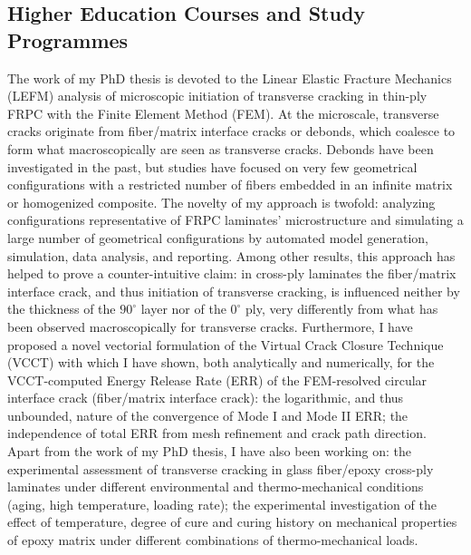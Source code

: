 \documentclass[
  a4paper, 
]{fortysecondscv}
\begin{document}
\subsection{Higher Education Courses and Study Programmes}
The work of my PhD thesis is devoted to the Linear Elastic Fracture Mechanics (LEFM) analysis of microscopic initiation of transverse cracking in thin-ply FRPC with the Finite Element Method (FEM). At the microscale, transverse cracks originate from fiber/matrix interface cracks or debonds, which coalesce to form what macroscopically are seen as transverse cracks. Debonds have been investigated in the past, but studies have focused on very few geometrical configurations with a restricted number of fibers embedded in an infinite matrix or homogenized composite. The novelty of my approach is twofold: analyzing configurations representative of FRPC laminates' microstructure and simulating a large number of geometrical configurations by automated model generation, simulation, data analysis, and reporting. Among other results, this approach has helped to prove a counter-intuitive claim: in cross-ply laminates the fiber/matrix interface crack, and thus initiation of transverse cracking, is influenced neither by the thickness of the $90^{\circ}$ layer nor of the $0^{\circ}$ ply, very differently from what has been observed macroscopically for transverse cracks. Furthermore, I have proposed a novel vectorial formulation of the Virtual Crack Closure Technique (VCCT) with which I have shown, both analytically and numerically, for the VCCT-computed Energy Release Rate (ERR) of the FEM-resolved circular interface crack (fiber/matrix interface crack): the logarithmic, and thus unbounded, nature of the convergence of Mode I and Mode II ERR; the independence of total ERR from mesh refinement and crack path direction.\\
Apart from the work of my PhD thesis, I have also been working on: the experimental assessment of transverse cracking in glass fiber/epoxy cross-ply laminates under different environmental and thermo-mechanical conditions (aging, high temperature, loading rate); the experimental investigation of the effect of temperature, degree of cure and curing history on mechanical properties of epoxy matrix under different combinations of thermo-mechanical loads.
\end{document}
